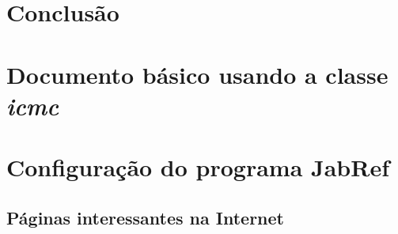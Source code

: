 \documentclass[mestrado, pre-defesa]{packages/icmc}
\begin{document}
\chapter{Conclusão}
\label{chapter:10_conclusion}


% 

\postextual





\glsaddall
\printglossaries


\begin{apendicesenv}

\chapter{Documento básico usando a classe \textit{icmc}}
\label{chapter:documento-basico}
    
\chapter{Configuração do programa JabRef}
\label{chapter:configuracao-jabref}


\end{apendicesenv}



\begin{anexosenv}

    \chapter{Páginas interessantes na Internet} 
    \label{chapter:paginas-interessantes}
    

\end{anexosenv}
\end{document}
